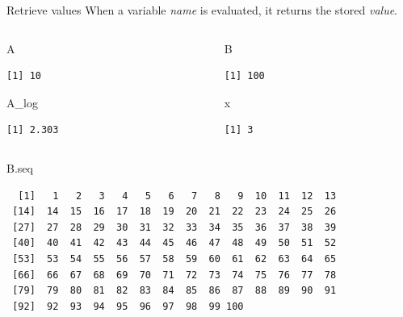 \documentclass[
  11pt,
  ignorenonframetext,
]{beamer}
\newenvironment{Shaded}{\begin{snugshade}}{\end{snugshade}}
\newcommand{\NormalTok}[1]{#1}
\begin{document}
\begin{frame}[fragile]{Retrieve values}
\protect\hypertarget{retrieve-values}{}
When a variable \emph{name} is evaluated, it returns the stored
\emph{value}.

\begin{columns}[T,onlytextwidth]
\begin{column}{0.45\textwidth}
\begin{Shaded}
\begin{Highlighting}[]
\NormalTok{A}
\end{Highlighting}
\end{Shaded}

\begin{verbatim}
[1] 10
\end{verbatim}

\begin{Shaded}
\begin{Highlighting}[]
\NormalTok{A\_log}
\end{Highlighting}
\end{Shaded}

\begin{verbatim}
[1] 2.303
\end{verbatim}
\end{column}

\begin{column}{0.45\textwidth}
\begin{Shaded}
\begin{Highlighting}[]
\NormalTok{B}
\end{Highlighting}
\end{Shaded}

\begin{verbatim}
[1] 100
\end{verbatim}

\begin{Shaded}
\begin{Highlighting}[]
\NormalTok{x}
\end{Highlighting}
\end{Shaded}

\begin{verbatim}
[1] 3
\end{verbatim}
\end{column}
\end{columns}

\begin{Shaded}
\begin{Highlighting}[]
\NormalTok{B.seq}
\end{Highlighting}
\end{Shaded}

\begin{verbatim}
  [1]   1   2   3   4   5   6   7   8   9  10  11  12  13
 [14]  14  15  16  17  18  19  20  21  22  23  24  25  26
 [27]  27  28  29  30  31  32  33  34  35  36  37  38  39
 [40]  40  41  42  43  44  45  46  47  48  49  50  51  52
 [53]  53  54  55  56  57  58  59  60  61  62  63  64  65
 [66]  66  67  68  69  70  71  72  73  74  75  76  77  78
 [79]  79  80  81  82  83  84  85  86  87  88  89  90  91
 [92]  92  93  94  95  96  97  98  99 100
\end{verbatim}
\end{frame}
\end{document}
